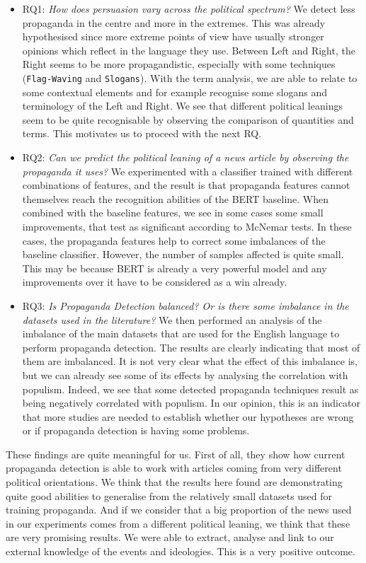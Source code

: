 \begin{itemize}
    \item RQ1: \emph{How does persuasion vary across the political spectrum?} We detect less propaganda in the centre and more in the extremes. This was already hypothesised since more extreme points of view have usually stronger opinions which reflect in the language they use. Between Left and Right, the Right seems to be more propagandistic, especially with some techniques (\texttt{Flag-Waving} and \texttt{Slogans}). With the term analysis, we are able to relate to some contextual elements and for example recognise some slogans and terminology of the Left and Right. We see that different political leanings seem to be quite recognisable by observing the comparison of quantities and terms. This motivates us to proceed with the next RQ.
    \item RQ2: \emph{Can we predict the political leaning of a news article by observing the propaganda it uses?} We experimented with a classifier trained with different combinations of features, and the result is that propaganda features cannot themselves reach the recognition abilities of the BERT baseline. When combined with the baseline features, we see in some cases some small improvements, that test as significant according to McNemar tests. In these cases, the propaganda features help to correct some imbalances of the baseline classifier. However, the number of samples affected is quite small. This may be because BERT is already a very powerful model and any improvements over it have to be considered as a win already.
    \item RQ3: \emph{Is Propaganda Detection balanced? Or is there some imbalance in the datasets used in the literature?} We then performed an analysis of the imbalance of the main datasets that are used for the English language to perform propaganda detection. The results are clearly indicating that most of them are imbalanced. It is not very clear what the effect of this imbalance is, but we can already see some of its effects by analysing the correlation with populism. Indeed, we see that some detected propaganda techniques result as being negatively correlated with populism. In our opinion, this is an indicator that more studies are needed to establish whether our hypotheses are wrong or if propaganda detection is having some problems.
\end{itemize}




These findings are quite meaningful for us.
First of all, they show how current propaganda detection is able to work with articles coming from very different political orientations. We think that the results here found are demonstrating quite good abilities to generalise from the relatively small datasets used for training propaganda.
And if we consider that a big proportion of the news used in our experiments comes from a different political leaning, we think that these are very promising results.
We were able to extract, analyse and link to our external knowledge of the events and ideologies. This is a very positive outcome.

